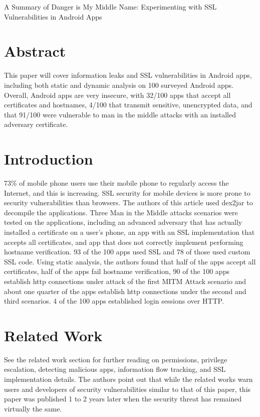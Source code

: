 \documentclass{article}
\begin{document}
\begin{center}
\LARGE A Summary of Danger is My Middle Name: Experimenting with SSL Vulnerabilities in Android Apps 
\end{center}

\section{Abstract}
This paper will cover information leaks and SSL vulnerabilities in Android apps, including both static and dynamic analysis on 100 surveyed Android apps. Overall, Android apps are very insecure, with 32/100 apps that accept all certificates and hostnames, 4/100 that transmit sensitive, unencrypted data, and that 91/100 were vulnerable to man in the middle attacks with an installed adversary certificate. 

\section{Introduction}
73\% of mobile phone users use their mobile phone to regularly access the Internet, and this is increasing. SSL security for mobile devices is more prone to security vulnerabilities than browsers. The authors of this article used dex2jar to decompile the applications. Three Man in the Middle attacks scenarios were tested on the applications, including an advanced adversary that has actually installed a certificate on a user's phone, an app with an SSL implementation that accepts all certificates, and app that does not correctly implement performing hostname verification. 93 of the 100 apps used SSL and 78 of those used custom SSL code. Using static analysis, the authors found that half of the apps accept all certificates, half of the apps fail hostname verification, 90 of the 100 apps establish http connections under attack of the first MITM Attack scenario and about one quarter of the apps establish http connections under the second and third scenarios. 4 of the 100 apps established login sessions over HTTP.

\section{Related Work}
See the related work section for further reading on permissions, privilege escalation, detecting malicious apps, information flow tracking, and SSL implementation details. The authors point out that while the related works warn users and developers of security vulnerabilities similar to that of this paper, this paper was published 1 to 2 years later when the security threat has remained virtually the same. 
\end{document}
